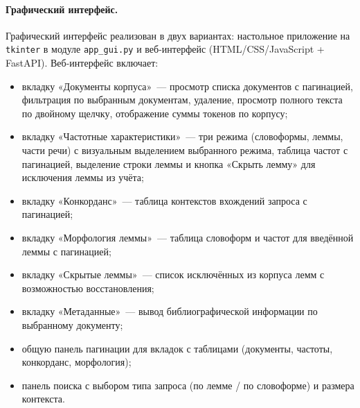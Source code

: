 \paragraph{Графический интерфейс.}
Графический интерфейс реализован в двух вариантах: настольное приложение на \verb|tkinter| в модуле \verb|app_gui.py| и веб-интерфейс (HTML/CSS/JavaScript + FastAPI). Веб-интерфейс включает:
\begin{itemize}
  \item вкладку «Документы корпуса»~--- просмотр списка документов с пагинацией, фильтрация по выбранным документам, удаление, просмотр полного текста по двойному щелчку, отображение суммы токенов по корпусу;
  \item вкладку «Частотные характеристики»~--- три режима (словоформы, леммы, части речи) с визуальным выделением выбранного режима, таблица частот с пагинацией, выделение строки леммы и кнопка «Скрыть лемму» для исключения леммы из учёта;
  \item вкладку «Конкорданс»~--- таблица контекстов вхождений запроса с пагинацией;
  \item вкладку «Морфология леммы»~--- таблица словоформ и частот для введённой леммы с пагинацией;
  \item вкладку «Скрытые леммы»~--- список исключённых из корпуса лемм с возможностью восстановления;
  \item вкладку «Метаданные»~--- вывод библиографической информации по выбранному документу;
  \item общую панель пагинации для вкладок с таблицами (документы, частоты, конкорданс, морфология);
  \item панель поиска с выбором типа запроса (по лемме / по словоформе) и размера контекста.
\end{itemize}
